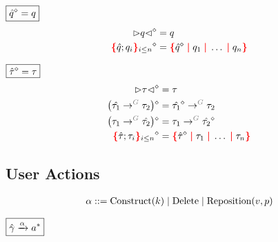 \noindent $\boxed{\erase{\Z{q}} = q}$
%
\begin{align*}
  \erase{\cursor{q}} &= q \\
  \erase{\conflictHoleForm{\Z{q}; q_i}{i \leq n}} &= \conflictHole{\erase{\Z{q}}, q_1, \ldots, q_n}
\end{align*}

\noindent $\boxed{\erase{\Z{\tau}} = \tau}$
%
\begin{align*}
  \erase{\cursor{\tau}} &= \tau \\
  \erase{\left(\tArrow{G}{\Z{\tau_1}}{\tau_2}\right)} &= \tArrow{G}{\erase{\Z{\tau_1}}}{\tau_2} \\
  \erase{\left(\tArrow{G}{\tau_1}{\Z{\tau_2}}\right)} &= \tArrow{G}{\tau_1}{\erase{\Z{\tau_2}}} \\
  \erase{\conflictHoleForm{\Z{\tau}; \tau_i}{i \leq n}} &= \conflictHole{\erase{\Z{\tau}}, \tau_1, \ldots, \tau_n}
\end{align*}


\subsection{User Actions}


\[
  \arraycolsep=0pt
  \begin{array}{llll}
    \alpha & {}::={} &
      \Construct{k}
      \mid \Delete
      \mid \Reposition{v}{p}
    \\
  \end{array}
\]

\noindent $\boxed{\Z{\Grove} \action{\alpha} a^{*}}$
%
\begin{mathpar}


\end{mathpar}

